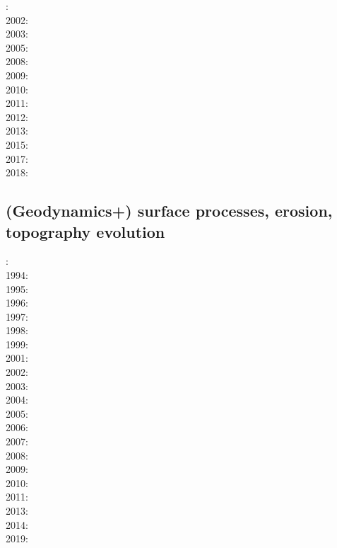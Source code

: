 : \cite{coks00}\\
2002: \cite{cacp02}\cite{coks02}\\
2003: \cite{cock03}\\
2005: \cite{cacs05}\cite{coks05}\\
2008: \cite{kans08}\cite{mofh08}\cite{dole08}\\
2009: \cite{coks09}\cite{cogo09}\\
2010: \cite{ngpc10}\cite{conp10}\cite{mofp10}\\
2011: \cite{geor11}\cite{ngpc11}\\
2012: \cite{kauf12}\cite{ngpe12}\cite[chapt. 31]{lomw12}\\
2013: \cite{vyrc13}\\
2015: \cite{lelk15} \\
2017: \cite{fewk17}\cite{iglo17}\cite{hepb17}\\
2018: \cite{puth18}

\mscthesis {}

\subsection*{(Geodynamics+) surface processes, erosion, topography evolution}

: \cite{befh92}\\
1994: \cite{howa94}\cite{koon94}\cite{kobe94}\\
1995: \cite{chmm95}\cite{koon95}\\
1996: \cite{avbu96}\cite{bekh96}\\
1997: \cite{brsa97}\cite{gaft97}\cite{babr97}\\
1998: \cite{deea98}\cite{vabr98}\\
1999: \cite{will99a}\cite{bupi99}\cite{babr99}\\
2001: \cite{zemk01}\cite{tulg01}\cite{brsh01}\cite{bupo01}\cite{coul01}\cite{crda01}\\
2002: \cite{wibr02}\cite{mobr02}\cite{garc02}\\
2003: \cite{brau03}\\
2004: \cite{fijj04}\cite{gocl04}\\
2005: \cite{lave05}\cite{will05}\\
2006: \cite{rosw06}\cite{brau06gsl}\cite{bocr06}\\
2007: \cite{buto07}\\
2008: \cite{alle08}\cite{rowf08}\\
2009: \cite{whip09}\cite{kuhe09}\cite{makh09}\\
2010: \cite{will10}\cite{tuha10}\cite{brau10b}\cite{brau10}\cite{brya10}\cite{cmwt10}\\
2011: \cite{robr11}\cite{grhd11}\\
2013: \cite{vehc13}\cite{brwi13}\cite{fihv13a}\cite{fihv13b}\cite{brrs13}\cite{chgz13} \\
2014: \cite{crbr14}\cite{cokm14}\cite{erhv14}\cite{erhv15} \\
2019: \cite{anpa19}

